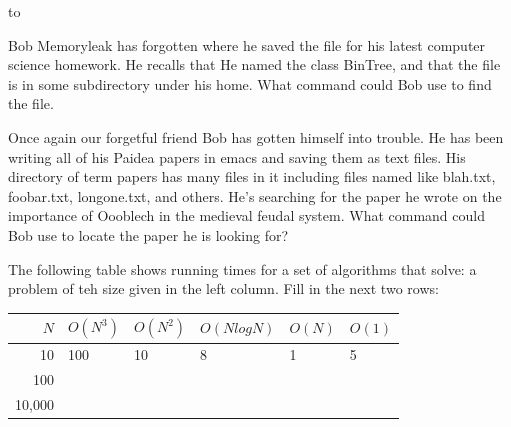 \documentclass[11pt,letter]{exam}
\begin{document}
\begin{center} 
\end{center} 
\lstset{language=Java,numbers=left}

\vspace{0.1in} 
\hbox to \textwidth{Name:\enspace\hrulefill} 


\begin{questions}

\question[5]
Bob Memoryleak has forgotten where he saved the file for his latest computer
science homework.  He recalls that He named the class BinTree, and that the file
is in some subdirectory under his home.  What command 
could Bob use to find the file.
\vspace{0.5in}

\question[5]
Once again our forgetful friend Bob has gotten himself into trouble. He has been
writing all of his Paidea papers in emacs and saving them as text files. His
directory of term papers has many files in it including files named like
blah.txt, foobar.txt, longone.txt, and others. He's searching for the paper he
wrote on the importance of Oooblech in the medieval feudal system. What command
could Bob use to locate the paper he is looking for?
\vspace{0.5in}

\question[10]
The following table shows running times for a set of algorithms that solve:
a problem of teh size given in the left column.  Fill in the next two rows: 
\begin{table}[h]
  \centering
  \begin{tabularx}{5in}{|r|X|X|X|X|X|}
    \hline
     $N$ & $O(N^3)$ & $O(N^2)$ & $O(N log{N})$ &  $O(N)$ & $O(1)$ \\[10pt]
    \hline
    10 &  100 &  10 & 8 &  1 & 5 \\[10pt]
    \hline
    100 &  &  &  &  &  \\[10pt]
    \hline
    10,000 &  &  &  &  &  \\[10pt]
    \hline
  \end{tabularx}


\end{table}
\end{questions}
\end{document}
